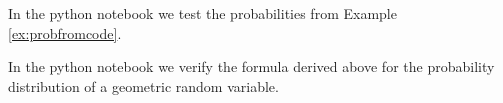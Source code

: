 \begin{example}
In the python notebook we test the probabilities from Example \ref{ex:probfromcode}. 
\end{example}

\begin{example}
In the python notebook we verify the formula derived above for the probability distribution of a geometric random variable. 
\end{example}






%
